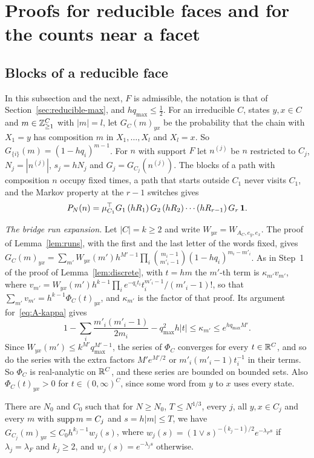 \section{Proofs for reducible faces and for the counts near a facet}\label{app:counts}

\subsection{Blocks of a reducible face}\label{app:reducible-blocks}

In this subsection and the next, $F$ is admissible, the notation is that of
Section~\ref{sec:reducible-max}, and $hq_{\max}\le\frac12$. For an irreducible $C$, states
$y,x\in C$ and $m\in\mathbb{Z}_{\ge1}^C$ with $|m|=l$, let $G_C(m)_{yx}$ be the probability that the chain
with $X_1=y$ has composition $m$ in $X_1,\dots,X_l$ and $X_l=x$. So $G_{\{i\}}(m)=(1-hq_i)^{m-1}$.
For $n$ with support $F$ let $n^{(j)}$ be $n$ restricted to $C_j$, $N_j=|n^{(j)}|$, $s_j=hN_j$ and
$G_j=G_{C_j}(n^{(j)})$. The blocks of a path with composition $n$ occupy fixed times, a path that
starts outside $C_1$ never visits $C_1$, and the Markov property at the $r-1$ switches gives
\[
P_N(n)=\mu_{C_1}^\top G_1\,(hR_1)\,G_2\,(hR_2)\cdots(hR_{r-1})\,G_r\,\mathbf{1} .
\]

\emph{The bridge run expansion.} Let $|C|=k\ge2$ and write $W_{yx}=W_{A_C,e_y,e_x}$. The proof of
Lemma~\ref{lem:runs}, with the first and the last letter of the words fixed, gives
$G_C(m)_{yx}=\sum_{m'}W_{yx}(m')h^{M'-1}\prod_i\binom{m_i-1}{m'_i-1}(1-hq_i)^{m_i-m'_i}$. As in
Step~1 of the proof of Lemma~\ref{lem:discrete}, with $t=hm$ the $m'$-th term is $\kappa_{m'}v_{m'}$,
where $v_{m'}=W_{yx}(m')h^{k-1}\prod_ie^{-q_it_i}t_i^{m'_i-1}/(m'_i-1)!$, so that
$\sum_{m'}v_{m'}=h^{k-1}\Phi_C(t)_{yx}$, and $\kappa_{m'}$ is the factor of that proof. Its
argument for~\eqref{eq:A-kappa} gives
\[
1-\sum_i\frac{m'_i(m'_i-1)}{2m_i}-q_{\max}^2h|t|\le\kappa_{m'}\le e^{hq_{\max}M'} .
\]
Since $W_{yx}(m')\le k^{M'}q_{\max}^{M'-1}$, the series of $\Phi_C$ converges for every
$t\in\mathbb{R}^C$, and so do the series with the extra factors $M'e^{M'/2}$ or $m'_i(m'_i-1)t_i^{-1}$ in their
terms. So $\Phi_C$ is real-analytic on $\mathbb{R}^C$, and these series are bounded on bounded sets.
Also $\Phi_C(t)_{yx}>0$ for $t\in(0,\infty)^C$, since some word from $y$ to $x$ uses every state.

\begin{lemma}\label{lem:block-bound}
There are $N_0$ and $C_0$ such that for $N\ge N_0$, $T\le N^{1/3}$, every $j$, all $y,x\in C_j$ and every
$m$ with $\operatorname{supp} m=C_j$ and $s=h|m|\le T$, we have $G_{C_j}(m)_{yx}\le C_0h^{k_j-1}w_j(s)$, where
$w_j(s)=(1\vee s)^{-(k_j-1)/2}e^{-\lambda_Fs}$ if $\lambda_j=\lambda_F$ and $k_j\ge2$, and
$w_j(s)=e^{-\lambda_js}$ otherwise.
\end{lemma}

